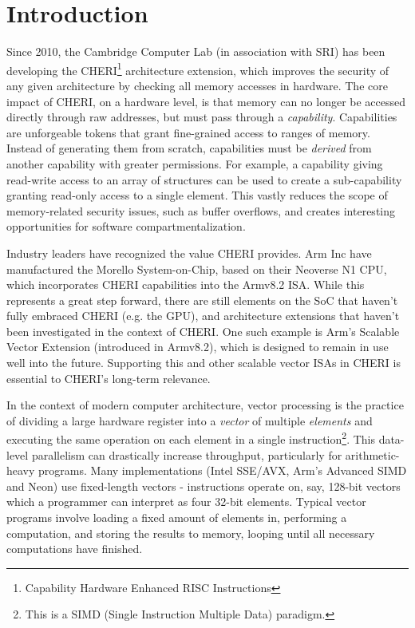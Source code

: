 \chapter{Introduction}

Since 2010, the Cambridge Computer Lab (in association with SRI) has been developing the  CHERI\footnote{Capability Hardware Enhanced RISC Instructions} architecture extension, which improves the security of any given architecture by checking all memory accesses in hardware.
The core impact of CHERI, on a hardware level, is that memory can no longer be accessed directly through raw addresses, but must pass through a \emph{capability}.
Capabilities are unforgeable tokens that grant fine-grained access to ranges of memory.
Instead of generating them from scratch, capabilities must be \emph{derived} from another capability with greater permissions.
For example, a capability giving read-write access to an array of structures can be used to create a sub-capability granting read-only access to a single element.
This vastly reduces the scope of memory-related security issues, such as buffer overflows, and creates interesting opportunities for software compartmentalization.

Industry leaders have recognized the value CHERI provides.
Arm Inc have manufactured the Morello System-on-Chip, based on their Neoverse N1 CPU, which incorporates CHERI capabilities into the Armv8.2 ISA.
While this represents a great step forward, there are still elements on the SoC that haven't fully embraced CHERI (e.g. the GPU), and architecture extensions that haven't been investigated in the context of CHERI.
One such example is Arm's Scalable Vector Extension (introduced in Armv8.2), which is designed to remain in use well into the future.
Supporting this and other scalable vector ISAs in CHERI is essential to CHERI's long-term relevance.

In the context of modern computer architecture, vector processing is the practice of dividing a large hardware register into a \emph{vector} of multiple \emph{elements} and executing the same operation on each element in a single instruction\footnote{This is a SIMD (Single Instruction Multiple Data) paradigm.}.
This data-level parallelism can drastically increase throughput, particularly for arithmetic-heavy programs.
Many implementations (Intel SSE/AVX, Arm's Advanced SIMD and Neon) use fixed-length vectors - instructions operate on, say, 128-bit vectors which a programmer can interpret as four 32-bit elements.
Typical vector programs involve loading a fixed amount of elements in, performing a computation, and storing the results to memory, looping until all necessary computations have finished.

